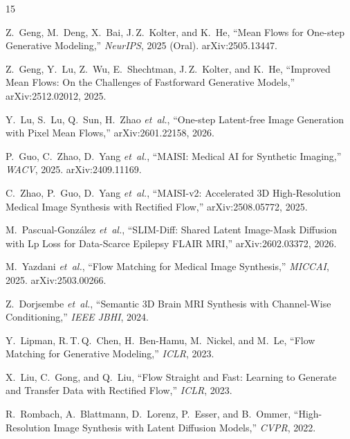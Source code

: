 \documentclass[11pt,a4paper]{article}
\newcommand{\etal}{\textit{et~al.}}
\begin{document}
\begingroup
\renewcommand{\section}[2]{}  %
\begin{thebibliography}{15}

Z.~Geng, M.~Deng, X.~Bai, J.\,Z.~Kolter, and K.~He,
``Mean Flows for One-step Generative Modeling,''
\emph{NeurIPS}, 2025 (Oral). arXiv:2505.13447.

Z.~Geng, Y.~Lu, Z.~Wu, E.~Shechtman, J.\,Z.~Kolter, and K.~He,
``Improved Mean Flows: On the Challenges of Fastforward Generative Models,''
arXiv:2512.02012, 2025.

Y.~Lu, S.~Lu, Q.~Sun, H.~Zhao \etal,
``One-step Latent-free Image Generation with Pixel Mean Flows,''
arXiv:2601.22158, 2026.

P.~Guo, C.~Zhao, D.~Yang \etal,
``MAISI: Medical AI for Synthetic Imaging,''
\emph{WACV}, 2025. arXiv:2409.11169.

C.~Zhao, P.~Guo, D.~Yang \etal,
``MAISI-v2: Accelerated 3D High-Resolution Medical Image Synthesis with
Rectified Flow,''
arXiv:2508.05772, 2025.

M.~Pascual-Gonz\'{a}lez \etal,
``SLIM-Diff: Shared Latent Image-Mask Diffusion with Lp Loss for Data-Scarce
Epilepsy FLAIR MRI,''
arXiv:2602.03372, 2026.

M.~Yazdani \etal,
``Flow Matching for Medical Image Synthesis,''
\emph{MICCAI}, 2025. arXiv:2503.00266.

Z.~Dorjsembe \etal,
``Semantic 3D Brain MRI Synthesis with Channel-Wise Conditioning,''
\emph{IEEE JBHI}, 2024.

Y.~Lipman, R.\,T.\,Q.~Chen, H.~Ben-Hamu, M.~Nickel, and M.~Le,
``Flow Matching for Generative Modeling,''
\emph{ICLR}, 2023.

X.~Liu, C.~Gong, and Q.~Liu,
``Flow Straight and Fast: Learning to Generate and Transfer Data with Rectified
Flow,''
\emph{ICLR}, 2023.

R.~Rombach, A.~Blattmann, D.~Lorenz, P.~Esser, and B.~Ommer,
``High-Resolution Image Synthesis with Latent Diffusion Models,''
\emph{CVPR}, 2022.


\end{thebibliography}
\end{document}
